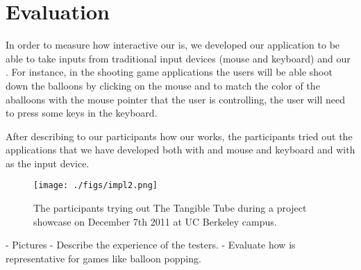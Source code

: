 \section{Evaluation}\label{sec:eval}
In order to measure how interactive our \tube is, we developed our application to be able to take inputs from traditional input devices (\ie mouse and keyboard) and our \tube. For instance, in the shooting game applications the users will be able shoot down the balloons by clicking on the mouse and to match the color of the aballoons with the mouse pointer that the user is controlling, the user will need to press some keys in the keyboard.

After describing to our participants how our \tube works, the participants tried out the applications that we have developed both with and mouse and keyboard and with \tube as the input device.

\begin{figure}
  \centering
  \texttt{[image: ./figs/impl2.png]}
  \caption{The participants trying out The Tangible Tube during a project showcase on December 7th 2011 at UC Berkeley campus.}
  \label{fig:impl2}
\end{figure}

\TODO
- Pictures \newline
- Describe the experience of the testers. \newline
- Evaluate how \tube is representative for games like balloon popping.
